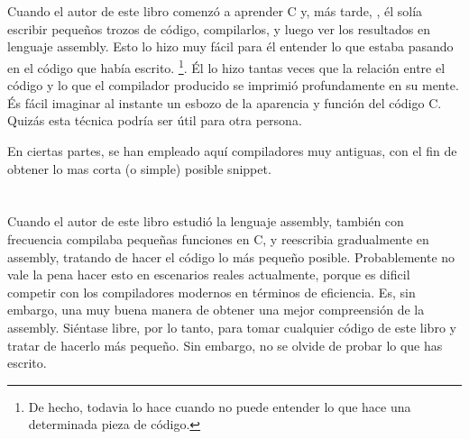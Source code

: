 \section{\ESph{}}

Cuando el autor de este libro comenzó a aprender C y, más tarde, \Cpp, él solía escribir pequeños trozos de código, compilarlos, 
y luego ver los resultados en lenguaje assembly. Esto lo hizo muy fácil para él entender lo que estaba pasando en el código que había escrito.
\footnote{De hecho, todavia lo hace cuando no puede entender lo que hace una determinada pieza de código.}. 
Él lo hizo tantas veces que la relación entre el código \CCpp y lo que el compilador producido se imprimió profundamente en su mente. 
És fácil imaginar al instante un esbozo de la aparencia y función del código C. 
Quizás esta técnica podría ser útil para otra persona.


En ciertas partes, se han empleado aquí compiladores muy antiguas, con el fin de obtener lo mas corta (o simple) posible snippet.

\section*{\Exercises}

Cuando el autor de este libro estudió la lenguaje assembly, también con frecuencia compilaba pequeñas funciones en C, y reescribia gradualmente en assembly, tratando de hacer el código lo más pequeño posible.
Probablemente no vale la pena hacer esto en escenarios reales actualmente, 
porque es dificil competir con los compiladores modernos en términos de eficiencia. Es, sin embargo, una muy buena manera de obtener una mejor compreensión de la assembly.
Siéntase libre, por lo tanto, para tomar cualquier código de este libro y tratar de hacerlo más pequeño.
Sin embargo, no se olvide de probar lo que has escrito.


